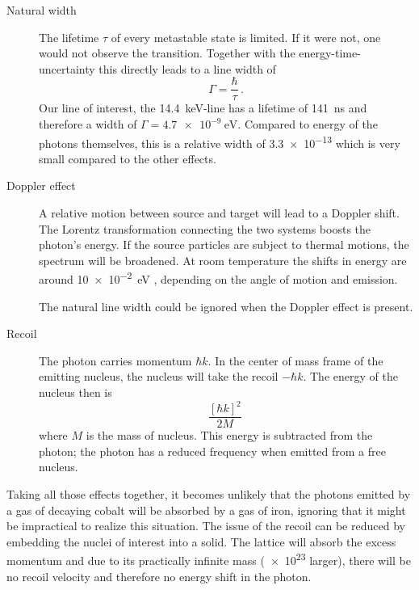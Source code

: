 \documentclass[11pt, english, fleqn, DIV=15, headinclude, BCOR=2cm]{scrreprt}
\begin{document}
\begin{description}
    \item[Natural width]
        The lifetime $\tau$ of every metastable state is limited. If it were
        not, one would not observe the transition. Together with the
        energy-time-uncertainty this directly leads to a line width of
        \[
            \Gamma = \frac\hbar\tau \,.
        \]
        Our line of interest, the \SI{14.4}{\kilo\electronvolt}-line has a
        lifetime of \SI{141}{\nano\second} and therefore a width of $\Gamma =
        \SI{4.7e-9}{\electronvolt}$. Compared to energy of the photons
        themselves, this is a relative width of \num{3.3e-13} which is very
        small compared to the other effects.
        \parencite[42]{Schatz/Nukleare_Festkoerperphysik}

    \item[Doppler effect]
        A relative motion between source and target will lead to a Doppler
        shift. The Lorentz transformation connecting the two systems boosts the
        photon's energy. If the source particles are subject to thermal
        motions, the spectrum will be broadened. At room temperature the shifts
        in energy are around \SI{10e-2}{\electronvolt}
        \parencite[43]{Schatz/Nukleare_Festkoerperphysik}, depending on the
        angle of motion and emission.

        The natural line width could be ignored when the Doppler effect is
        present.

    \item[Recoil]
        The photon carries momentum $\hbar k$. In the center of mass frame of
        the emitting nucleus, the nucleus will take the recoil $- \hbar k$. The
        energy of the nucleus then is
        \[
            \frac{[\hbar k]^2}{2 M} \,
        \]
        where $M$ is the mass of nucleus. This energy is subtracted from the
        photon; the photon has a reduced frequency when emitted from a free
        nucleus.
\end{description}

Taking all those effects together, it becomes unlikely that the photons emitted
by a gas of decaying cobalt will be absorbed by a gas of iron, ignoring that it
might be impractical to realize this situation. The issue of the recoil can be
reduced by embedding the nuclei of interest into a solid. The lattice will
absorb the excess momentum and due to its practically infinite mass (\num{e23}
larger), there will be no recoil velocity and therefore no energy shift in the
photon.
\end{document}
